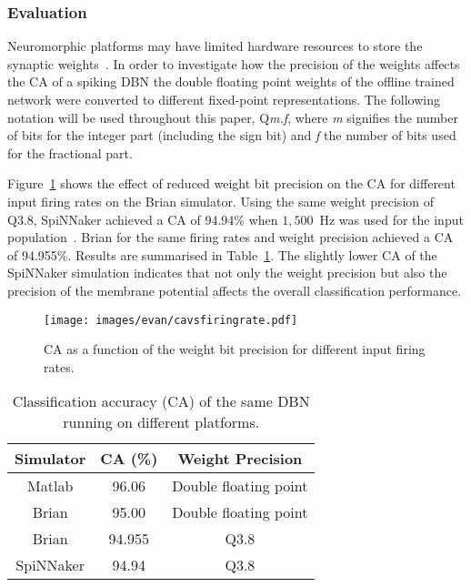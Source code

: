 \subsubsection{Evaluation}


Neuromorphic platforms may have limited hardware resources to store the synaptic weights~\citep{schemmel2010wafer,merolla2014million}. In order to investigate how the precision of the weights affects the CA of a spiking DBN the double floating point weights of the offline trained network were converted to different fixed-point representations. The following notation will be used throughout this paper, Q\textit{m.f}, where \textit{m} signifies the number of bits for the integer part (including the sign bit) and \textit{f} the number of bits used for the fractional part.

Figure~\ref{Fig:brianCAfiringrate} shows the effect of reduced weight bit precision on the CA for different input firing rates on the Brian simulator.
Using the same weight precision of Q3.8, SpiNNaker achieved a CA of 94.94\% when $1,500$~Hz was used for the input population~\citep{Stromatias2015scalable}. Brian for the same firing rates and weight precision achieved a CA of 94.955\%. Results are summarised in Table~\ref{tab:casimulators}.
The slightly lower CA of the SpiNNaker simulation indicates that not only the weight precision but also the precision of the membrane potential affects the overall classification performance.    

\begin{figure}[hbt!]
	\centering
	\texttt{[image: images/evan/cavsfiringrate.pdf]}
	\caption{CA as a function of the weight bit precision for different input firing rates.}
	\label{Fig:brianCAfiringrate}
\end{figure} 


\begin{table}[h]
\caption{Classification accuracy (CA) of the same DBN running on different platforms.}
\begin{center}
\begin{tabular} {c|c|c}
	Simulator & CA (\%) & Weight Precision \\
    \hline
    Matlab & 96.06 & Double floating point\\
    Brian & 95.00 & Double floating point\\
    Brian & 94.955 & Q3.8\\
    SpiNNaker & 94.94 & Q3.8\\
\end{tabular}
\label{tab:casimulators}
\end{center}
\end{table}

